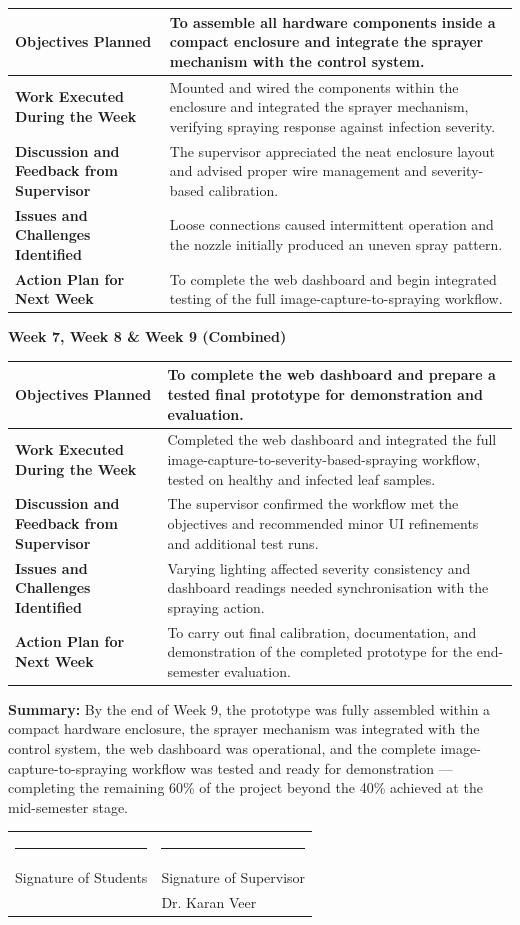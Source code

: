 \documentclass[12pt,a4paper,oneside]{report}
\newcommand{\diaryblock}[5]{%
\renewcommand{\arraystretch}{1.5}%
\noindent\begin{tabularx}{\textwidth}{|p{4.6cm}|X|}
\hline
\textbf{Objectives Planned} & #1 \\
\hline
\textbf{Work Executed During the Week} & #2 \\
\hline
\textbf{Discussion and Feedback from Supervisor} & #3 \\
\hline
\textbf{Issues and Challenges Identified} & #4 \\
\hline
\textbf{Action Plan for Next Week} & #5 \\
\hline
\end{tabularx}%
}
\begin{document}
\diaryblock
{To assemble all hardware components inside a compact enclosure and integrate the sprayer mechanism with the control system.}
{Mounted and wired the components within the enclosure and integrated the sprayer mechanism, verifying spraying response against infection severity.}
{The supervisor appreciated the neat enclosure layout and advised proper wire management and severity-based calibration.}
{Loose connections caused intermittent operation and the nozzle initially produced an uneven spray pattern.}
{To complete the web dashboard and begin integrated testing of the full image-capture-to-spraying workflow.}

\vspace{0.8cm}

\noindent\textbf{\large Week 7, Week 8 \& Week 9 (Combined)}
\vspace{0.2cm}

\diaryblock
{To complete the web dashboard and prepare a tested final prototype for demonstration and evaluation.}
{Completed the web dashboard and integrated the full image-capture-to-severity-based-spraying workflow, tested on healthy and infected leaf samples.}
{The supervisor confirmed the workflow met the objectives and recommended minor UI refinements and additional test runs.}
{Varying lighting affected severity consistency and dashboard readings needed synchronisation with the spraying action.}
{To carry out final calibration, documentation, and demonstration of the completed prototype for the end-semester evaluation.}

\vspace{0.8cm}

\noindent\textbf{Summary:} By the end of Week 9, the prototype was fully assembled within a compact
hardware enclosure, the sprayer mechanism was integrated with the control system, the web dashboard
was operational, and the complete image-capture-to-spraying workflow was tested and ready for
demonstration --- completing the remaining 60\% of the project beyond the 40\% achieved at the
mid-semester stage.

\vspace{1.2cm}
\renewcommand{\arraystretch}{1.3}
\noindent\begin{tabularx}{\textwidth}{p{}X}
\rule{5cm}{0.4pt} & \hfill\rule{5cm}{0.4pt} \\
Signature of Students & \hfill Signature of Supervisor \\
 & \hfill Dr. Karan Veer \\
\end{tabularx}
\end{document}
